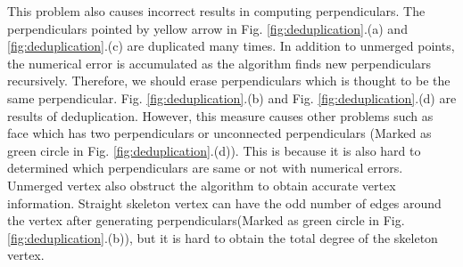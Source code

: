 \documentclass[11pt]{article}
\begin{document}
This problem also causes incorrect results in computing perpendiculars. The perpendiculars pointed by yellow arrow in Fig. \ref{fig:deduplication}.(a) and \ref{fig:deduplication}.(c) are duplicated many times. In addition to unmerged points, the numerical error is accumulated as the algorithm finds new perpendiculars recursively. Therefore, we should erase perpendiculars which is thought to be the same perpendicular. Fig. \ref{fig:deduplication}.(b) and Fig. \ref{fig:deduplication}.(d) are results of deduplication. However, this measure causes other problems such as face which has two perpendiculars or unconnected perpendiculars (Marked as green circle in Fig. \ref{fig:deduplication}.(d)). This is because it is also hard to determined which perpendiculars are same or not with numerical errors.\\
Unmerged vertex also obstruct the algorithm to obtain accurate vertex information. Straight skeleton vertex can have the odd number of edges around the vertex after generating perpendiculars(Marked as green circle in Fig. \ref{fig:deduplication}.(b)), but it is hard to obtain the total degree of the skeleton vertex.
\end{document}

